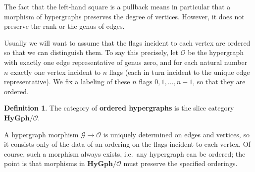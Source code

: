 \documentclass{article}
\theoremstyle{definition}
\newtheorem{defn}[thm]{Definition}
\theoremstyle{remark}
\def\G{\mathcal{G}}
\def\hy{\mathbf{HyGph}}
\def\thy{\mathcal{O}}
\begin{document}
The fact that the left-hand square is a pullback means in particular that a morphism of hypergraphs preserves the degree of vertices.
However, it does not preserve the rank or the genus of edges.

Usually we will want to assume that the flags incident to each vertex are ordered so that we can distinguish them.
To say this precisely, let $\thy$ be the hypergraph with exactly one edge representative of genus zero, and for each natural number $n$ exactly one vertex incident to $n$ flags (each in turn incident to the unique edge representative).
We fix a labeling of these $n$ flags $0,1,\dots,n-1$, so that they are ordered.

\begin{defn}
  The category of \textbf{ordered hypergraphs} is the slice category $\hy/\thy$.
\end{defn}

A hypergraph morphism $\G\to\thy$ is uniquely determined on edges and vertices, so it consists only of the data of an ordering on the flags incident to each vertex.
Of course, such a morphism always exists, i.e.\ any hypergraph can be ordered; the point is that morphisms in $\hy/\thy$ must preserve the specified orderings.
\end{document}
